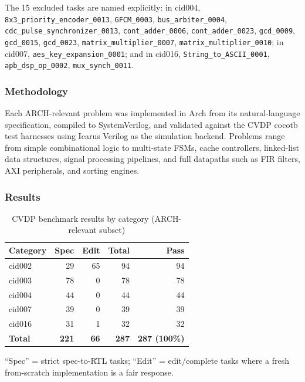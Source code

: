 \documentclass[manuscript]{acmart}
\begin{document}
The 15 excluded tasks are named explicitly: in cid004, \texttt{8x3\_priority\_encoder\_0013}, \texttt{GFCM\_0003}, \texttt{bus\_arbiter\_0004}, \texttt{cdc\_pulse\_synchronizer\_0013}, \texttt{cont\_adder\_0006}, \texttt{cont\_adder\_0023}, \texttt{gcd\_0009}, \texttt{gcd\_0015}, \texttt{gcd\_0023}, \texttt{matrix\_multiplier\_0007}, \texttt{matrix\_multiplier\_0010}; in cid007, \texttt{aes\_key\_expansion\_0001}; and in cid016, \texttt{String\_to\_ASCII\_0001}, \texttt{apb\_dsp\_op\_0002}, \texttt{mux\_synch\_0011}.

\subsubsection{Methodology}

Each ARCH-relevant problem was implemented in Arch from its natural-language specification, compiled to SystemVerilog, and validated against the CVDP cocotb test harnesses using Icarus Verilog as the simulation backend. Problems range from simple combinational logic to multi-state FSMs, cache controllers, linked-list data structures, signal processing pipelines, and full datapaths such as FIR filters, AXI peripherals, and sorting engines.

\subsubsection{Results}

\begin{table}[H]
\centering
\caption{CVDP benchmark results by category (ARCH-relevant subset)}
\label{tab:cvdp}
\footnotesize
\setlength{\tabcolsep}{3pt}
\begin{tabular}{@{}lrrrr@{}}
\toprule
\textbf{Category} & \textbf{Spec} & \textbf{Edit} & \textbf{Total} & \textbf{Pass} \\
\midrule
cid002 & 29 & 65 & 94 & 94 \\
cid003 & 78 & 0 & 78 & 78 \\
cid004 & 44 & 0 & 44 & 44 \\
cid007 & 39 & 0 & 39 & 39 \\
cid016 & 31 & 1 & 32 & 32 \\
\midrule
\textbf{Total} & \textbf{221} & \textbf{66} & \textbf{287} & \textbf{287 (100\%)} \\
\bottomrule
\end{tabular}

\vspace{0.5em}
\raggedright\footnotesize
``Spec'' = strict spec-to-RTL tasks; ``Edit'' = edit/complete tasks where a fresh from-scratch implementation is a fair response.
\end{table}
\end{document}
